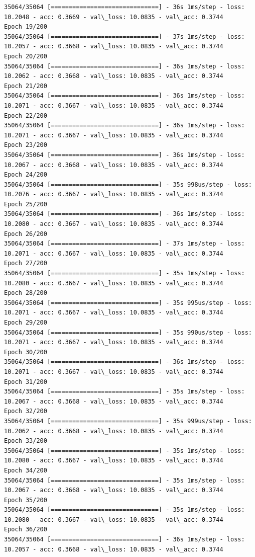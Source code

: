 \documentclass[11pt]{article}
\begin{document}
\begin{Verbatim}[commandchars=\\\{\}]
35064/35064 [==============================] - 36s 1ms/step - loss: 10.2048 - acc: 0.3669 - val\_loss: 10.0835 - val\_acc: 0.3744
Epoch 19/200
35064/35064 [==============================] - 37s 1ms/step - loss: 10.2057 - acc: 0.3668 - val\_loss: 10.0835 - val\_acc: 0.3744
Epoch 20/200
35064/35064 [==============================] - 36s 1ms/step - loss: 10.2062 - acc: 0.3668 - val\_loss: 10.0835 - val\_acc: 0.3744
Epoch 21/200
35064/35064 [==============================] - 36s 1ms/step - loss: 10.2071 - acc: 0.3667 - val\_loss: 10.0835 - val\_acc: 0.3744
Epoch 22/200
35064/35064 [==============================] - 36s 1ms/step - loss: 10.2071 - acc: 0.3667 - val\_loss: 10.0835 - val\_acc: 0.3744
Epoch 23/200
35064/35064 [==============================] - 36s 1ms/step - loss: 10.2067 - acc: 0.3668 - val\_loss: 10.0835 - val\_acc: 0.3744
Epoch 24/200
35064/35064 [==============================] - 35s 998us/step - loss: 10.2076 - acc: 0.3667 - val\_loss: 10.0835 - val\_acc: 0.3744
Epoch 25/200
35064/35064 [==============================] - 36s 1ms/step - loss: 10.2080 - acc: 0.3667 - val\_loss: 10.0835 - val\_acc: 0.3744
Epoch 26/200
35064/35064 [==============================] - 37s 1ms/step - loss: 10.2071 - acc: 0.3667 - val\_loss: 10.0835 - val\_acc: 0.3744
Epoch 27/200
35064/35064 [==============================] - 35s 1ms/step - loss: 10.2080 - acc: 0.3667 - val\_loss: 10.0835 - val\_acc: 0.3744
Epoch 28/200
35064/35064 [==============================] - 35s 995us/step - loss: 10.2071 - acc: 0.3667 - val\_loss: 10.0835 - val\_acc: 0.3744
Epoch 29/200
35064/35064 [==============================] - 35s 990us/step - loss: 10.2071 - acc: 0.3667 - val\_loss: 10.0835 - val\_acc: 0.3744
Epoch 30/200
35064/35064 [==============================] - 36s 1ms/step - loss: 10.2071 - acc: 0.3667 - val\_loss: 10.0835 - val\_acc: 0.3744
Epoch 31/200
35064/35064 [==============================] - 35s 1ms/step - loss: 10.2067 - acc: 0.3668 - val\_loss: 10.0835 - val\_acc: 0.3744
Epoch 32/200
35064/35064 [==============================] - 35s 999us/step - loss: 10.2062 - acc: 0.3668 - val\_loss: 10.0835 - val\_acc: 0.3744
Epoch 33/200
35064/35064 [==============================] - 35s 1ms/step - loss: 10.2080 - acc: 0.3667 - val\_loss: 10.0835 - val\_acc: 0.3744
Epoch 34/200
35064/35064 [==============================] - 35s 1ms/step - loss: 10.2067 - acc: 0.3668 - val\_loss: 10.0835 - val\_acc: 0.3744
Epoch 35/200
35064/35064 [==============================] - 35s 1ms/step - loss: 10.2080 - acc: 0.3667 - val\_loss: 10.0835 - val\_acc: 0.3744
Epoch 36/200
35064/35064 [==============================] - 36s 1ms/step - loss: 10.2057 - acc: 0.3668 - val\_loss: 10.0835 - val\_acc: 0.3744

\end{Verbatim}
\end{document}
